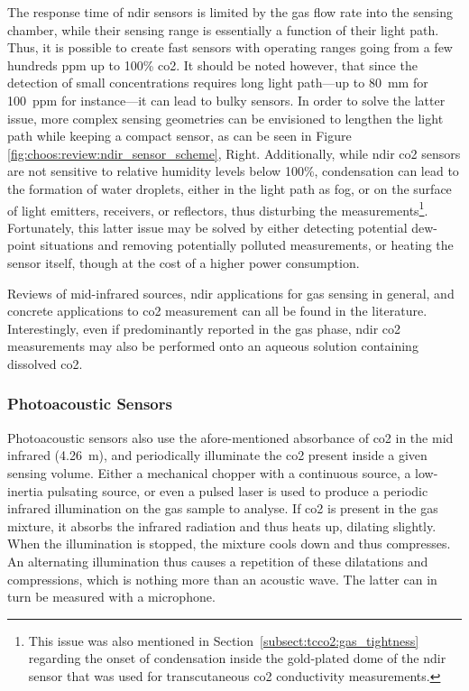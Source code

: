 The response time of \gls{ndir} sensors is limited by the gas flow rate into the sensing chamber, while their sensing range is essentially a function of their light path. Thus, it is possible to create fast sensors with operating ranges going from a few hundreds ppm up to 100\% \gls{co2}\cite{gibson2013, vincent2016}. It should be noted however, that since the detection of small concentrations requires long light path---up to 80~mm for 100~ppm for instance\cite{vincent2016}---it can lead to bulky sensors. In order to solve the latter issue, more complex sensing geometries can be envisioned to lengthen the light path while keeping a compact sensor, as can be seen in Figure \ref{fig:choos:review:ndir_sensor_scheme}, Right. Additionally, while \gls{ndir} \gls{co2} sensors are not sensitive to relative humidity levels below 100\%\cite{kohsiek1991, gibson2013}, condensation can lead to the formation of water droplets, either in the light path as fog, or on the surface of light emitters, receivers, or reflectors, thus disturbing the measurements\cite{vincent2016, muller2020}\footnote{This issue was also mentioned in Section~\ref{subsect:tcco2:gas_tightness} regarding the onset of condensation inside the gold-plated dome of the \gls{ndir} sensor that was used for transcutaneous \gls{co2} conductivity measurements.}. Fortunately, this latter issue may be solved by either detecting potential dew-point situations and removing potentially polluted measurements\cite{wang2018}, or heating the sensor itself, though at the cost of a higher power consumption\cite{fietzek2014, gss_condensation}.

Reviews of mid-infrared sources\cite{jung2017}, \gls{ndir} applications for gas sensing in general\cite{hodgkinson2012rev, popa2019}, and concrete applications to \gls{co2} measurement\cite{zhang2010, hodgkinson2013, moumen2016, vincent2016} can all be found in the literature. Interestingly, even if predominantly reported in the gas phase, \gls{ndir} \gls{co2} measurements may also be performed onto an aqueous solution containing dissolved \gls{co2}\cite{schaden2004}.

\subsubsection{Photoacoustic Sensors}\label{subsect:choos:review:photoacous}

Photoacoustic sensors also use the afore-mentioned absorbance of \gls{co2} in the mid infrared (4.26~\textmu{}m), and periodically illuminate the \gls{co2} present inside a given sensing volume. Either a mechanical chopper with a continuous source, a low-inertia pulsating source, or even a pulsed laser is used to produce a periodic infrared illumination on the gas sample to analyse. If \gls{co2} is present in the gas mixture, it absorbs the infrared radiation and thus heats up, dilating slightly. When the illumination is stopped, the mixture cools down and thus compresses. An alternating illumination thus causes a repetition of these dilatations and compressions, which is nothing more than an acoustic wave. The latter can in turn be measured with a microphone\cite{bozoki2011}.

